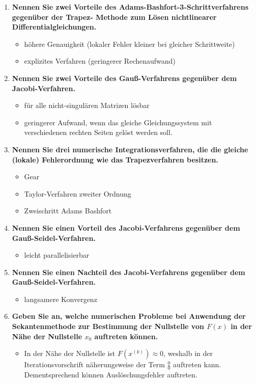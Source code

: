 \documentclass[fs, footer]{latex4ei}
\begin{document}
\begin{multicols*}{4}
{\begin{enumerate}
	\item \textbf{Nennen Sie zwei Vorteile des Adams-Bashfort-3-Schrittverfahrens gegenüber der Trapez- Methode zum Lösen nichtlinearer Differentialgleichungen.}
	\begin{itemize}
		\item höhere Genauigkeit (lokaler Fehler kleiner bei gleicher Schrittweite)
		\item explizites Verfahren (geringerer Rechenaufwand)
	\end{itemize}

	\item \textbf{Nennen Sie zwei Vorteile des Gauß-Verfahrens gegenüber dem Jacobi-Verfahren.}
	\begin{itemize}
		\item für alle nicht-singulären Matrizen lösbar
		\item geringerer Aufwand, wenn das gleiche Gleichungssystem mit verschiedenen rechten Seiten gelöst werden soll.
	\end{itemize}

	\item \textbf{Nennen Sie drei numerische Integrationsverfahren, die die gleiche (lokale) Fehlerordnung wie das Trapezverfahren besitzen.}
	\begin{itemize}
		\item Gear
		\item Taylor-Verfahren zweiter Ordnung
		\item Zweischritt Adams Bashfort
	\end{itemize}

	\item \textbf{Nennen Sie einen Vorteil des Jacobi-Verfahrens gegenüber dem Gauß-Seidel-Verfahren.}
	\begin{itemize}
		\item leicht parallelisierbar
	\end{itemize}

	\item \textbf{Nennen Sie einen Nachteil des Jacobi-Verfahrens gegenüber dem Gauß-Seidel-Verfahren.}
	\begin{itemize}
		\item langsamere Konvergenz
	\end{itemize}

	\item \textbf{Geben Sie an, welche numerischen Probleme bei Anwendung der Sekantenmethode zur Bestimmung der Nullstelle von $F(x)$ in der Nähe der Nullstelle $x_0$ auftreten können.}
	\begin{itemize}
		\item In der Nähe der Nullstelle ist $F(x^{(k)}) \approx 0$, weshalb in der Iterationsvorschrift näherungsweise der Term $\frac{0}{0}$ auftreten kann. Dementsprechend können Auslöschungsfehler auftreten.
	\end{itemize}


\end{enumerate}}
\end{multicols*}
\end{document}
